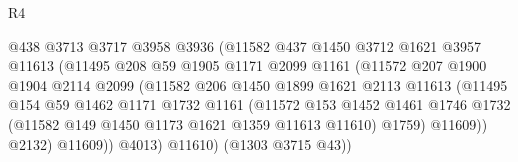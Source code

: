 \begin{lexlean}{R4}
\begin{coremodule}
                                    @438
                                    @3713
                                    @3717
                                    @3958
                                    @3936
                                    (@11582
                                      @437
                                      @1450
                                      @3712
                                      @1621
                                      @3957
                                      @11613
                                      (@11495
                                        @208
                                        @59
                                        @1905
                                        @1171
                                        @2099
                                        @1161
                                        (@11572
                                          @207
                                          @1900
                                          @1904
                                          @2114
                                          @2099
                                          (@11582
                                            @206
                                            @1450
                                            @1899
                                            @1621
                                            @2113
                                            @11613
                                            (@11495
                                              @154
                                              @59
                                              @1462
                                              @1171
                                              @1732
                                              @1161
                                              (@11572
                                                @153
                                                @1452
                                                @1461
                                                @1746
                                                @1732
                                                (@11582 @149 @1450 @1173 @1621 @1359 @11613 @11610)
                                                @1759)
                                              @11609))
                                          @2132)
                                        @11609))
                                    @4013)
                                  @11610)
                                (@1303 @3715 @43))

\end{coremodule}
\end{lexlean}
